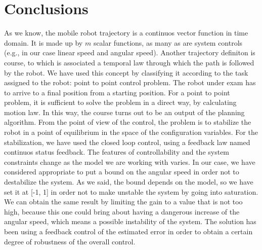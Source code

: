 \documentclass[a4paper,11pt,oneside]{book}
\begin{document}
\chapter*{Conclusions} %
As we know, the mobile robot trajectory is a continuos vector function in time domain. It is made up by $m$ scalar functions, as many as are system controls (e.g., in our case linear speed and angular speed). Another trajectory definiton is course, to which is associated a temporal law through which the path is followed by the robot. We have used this concept by classifying it according to the task assigned to the robot: point to point control problem. The robot under exam has to arrive to a final position from a starting position. For a point to point problem, it is sufficient to solve the problem in a direct way, by calculating motion law. In this way, the course turns out to be an output of the planning algorithm. From the point of view of the control, the problem is to stabilize the robot in a point of equilibrium in the space of the configuration variables. For the stabilization, we have used the closed loop control, using a feedback law named continuos status feedback.
The features of controllability and the system constraints change as the model we are working with varies. In our case, we have considered appropriate to put a bound on the angular speed in order not to destabilize the system. As we said, the bound depends on the model, so we have set it at [-1, 1] in order not to make unstable the system by going into saturation. We can obtain the same result by limiting the gain to a value that is not too high, because this one could bring about having a dangerous increase of the angular speed, which means a possible instability of the system.
The solution has been using a feedback control of the estimated error in order to obtain a certain degree of robustness of the overall control.



\end{document}
